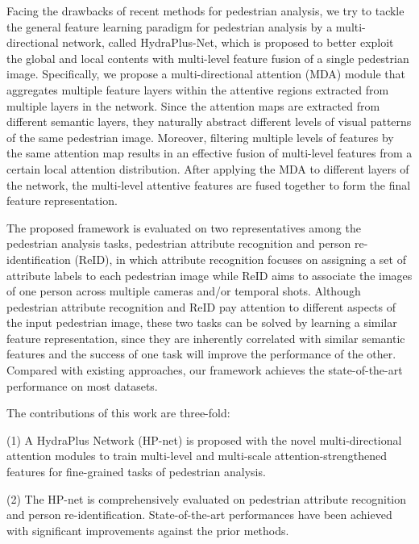 \documentclass[10pt,twocolumn,letterpaper]{article}
\begin{document}
Facing the drawbacks of recent methods for pedestrian analysis, we try to tackle the general feature learning paradigm for pedestrian analysis by a multi-directional network, called HydraPlus-Net, which is proposed to better exploit the global and local contents with multi-level feature fusion of a single pedestrian image.
Specifically, we propose a multi-directional attention (MDA) module that aggregates multiple feature layers within the attentive regions extracted from multiple layers in the network.
Since the attention maps are extracted from different semantic layers, they naturally abstract different levels of visual patterns of the same pedestrian image.
Moreover, filtering multiple levels of features by the same attention map results in an effective fusion of multi-level features from a certain local attention distribution.
After applying the MDA to different layers of the network, the multi-level attentive features are fused together to form the final feature representation.





The proposed framework is evaluated on two representatives among the pedestrian analysis tasks, \ie pedestrian attribute recognition and person re-identification (ReID), in which attribute recognition focuses on assigning a set of attribute labels to each pedestrian image while ReID aims to associate the images of one person across multiple cameras and/or temporal shots.
Although pedestrian attribute recognition and ReID pay attention to different aspects of the input pedestrian image, these two tasks can be solved by learning a similar feature representation, since they are inherently correlated with similar semantic features and the success of one task will improve the performance of the other.
Compared with existing approaches, our framework achieves the state-of-the-art performance on most datasets.





The contributions of this work are three-fold:

(1) A HydraPlus Network (HP-net) is proposed with the novel multi-directional attention modules to train multi-level and multi-scale attention-strengthened features for fine-grained tasks of pedestrian analysis.


(2) The HP-net is comprehensively evaluated on pedestrian attribute recognition and person re-identification.
State-of-the-art performances have been achieved with significant improvements against the prior methods.
\end{document}
